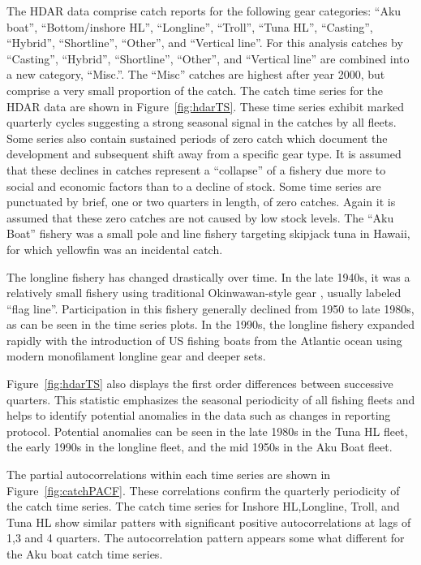 \documentclass[12pt,letterpaper]{article}
\newcommand\help[1]{\color{Magenta}{\it #1 }\normalcolor}
\begin{document}
The HDAR data comprise catch reports for the following gear
categories:
``Aku boat'', ``Bottom/inshore HL'', ``Longline'',  ``Troll'', ``Tuna
HL'', ``Casting'', ``Hybrid'',  ``Shortline'', ``Other'', and
``Vertical line''.
For this analysis catches by ``Casting'', ``Hybrid'',
``Shortline'', ``Other'', and ``Vertical line'' are combined into a new
category, ``Misc.''. The ``Misc''
catches are highest after year 2000,
but comprise a very small proportion of the catch.
The catch time series for the HDAR data are shown in
Figure~\ref{fig:hdarTS}. These time
series exhibit marked quarterly cycles suggesting a strong seasonal
signal in the catches by all fleets.
Some series also contain sustained periods of zero catch which
document the development and subsequent shift away from a specific
gear type. It is assumed that these declines in catches represent a
``collapse'' of a fishery due more to social and economic factors than
to a decline of stock.
Some time series are punctuated by brief, one or two quarters in
length, of zero catches. Again it is assumed that these zero catches
are not caused by low stock levels.
The ``Aku Boat'' fishery was a small pole and line fishery
targeting skipjack tuna in Hawaii, for which yellowfin was an
incidental catch. 

The longline fishery has changed drastically over time. In the late
1940s, it was a relatively small fishery using traditional
Okinwawan-style gear \help{(reference)}, usually labeled ``flag
line''. Participation in this fishery generally declined from 1950 to
late 1980s, as can be seen in the time series plots. In the 1990s, the longline
fishery expanded rapidly with the introduction of US fishing boats
from the Atlantic ocean using modern monofilament longline gear and
deeper sets.

Figure~\ref{fig:hdarTS} also displays the first order differences
between successive quarters. This statistic emphasizes the seasonal
periodicity of all fishing fleets and helps to identify potential anomalies in
the data such as changes in reporting protocol. Potential
anomalies can be seen in the late 1980s in the Tuna HL fleet, the
early 1990s in the longline fleet, and the mid 1950s in the Aku Boat
fleet. 

The partial autocorrelations within each time
series are shown in Figure~\ref{fig:catchPACF}. These correlations
confirm the quarterly periodicity  of the catch time series.
The catch time series for Inshore HL,Longline, Troll, and Tuna HL show
similar patters with
significant positive autocorrelations at lags of 1,3 and 4 quarters.
The autocorrelation pattern appears some what different for the Aku
boat catch time series.
\end{document}

